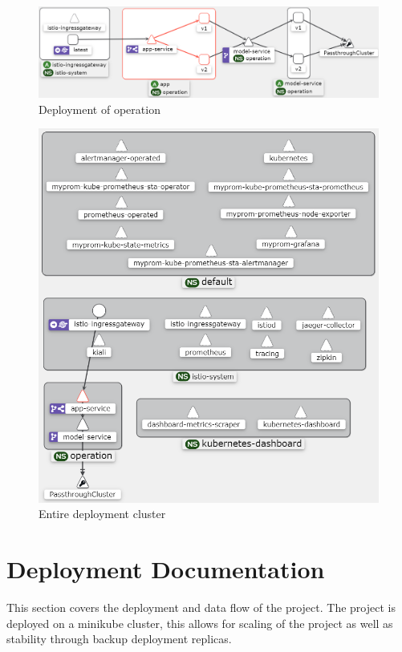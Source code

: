 \begin{figure}[ht!]
    \centering
    \includegraphics[width=18cm]{report/images/kiali.png}
    \caption{Deployment of operation}
    \label{fig:kiali}
\end{figure}
\begin{figure}[!ht]
    \centering
    \includegraphics[width=13cm]{report/images/kialiServices.png}
    \caption{Entire deployment cluster}
    \label{fig:kialiall}
\end{figure}
\clearpage
\section{Deployment Documentation}
This section covers the deployment and data flow of the project. The project is deployed on a minikube cluster, this allows for scaling of the project as well as stability through backup deployment replicas.

